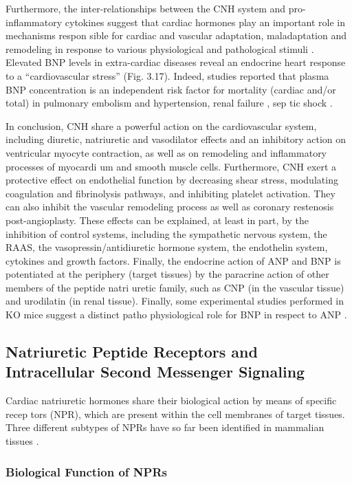 \documentclass[14pt,a4paper,onecolumn]{extarticle}
\begin{document}
Furthermore, the inter-relationships between the CNH system and pro-inflammatory cytokines suggest that cardiac hormones play an important role in mechanisms respon sible for cardiac and vascular adaptation, maladaptation and remodeling in response to various physiological and pathological stimuli \citep{32} \citep{35}.  Elevated BNP levels in extra-cardiac diseases reveal an endocrine heart response to a “cardiovascular stress” (Fig. 3.17). Indeed,  studies reported that plasma BNP concentration is an independent risk factor for mortality (cardiac and/or total) in pulmonary embolism \citep{121} \citep{123} \citep{124} and hypertension, renal failure \citep{28} \citep{100} \citep{144}, sep tic shock \citep{145}.

In conclusion, CNH share a powerful action on the cardiovascular system, including diuretic, natriuretic and vasodilator effects and an inhibitory action on ventricular myocyte contraction, as well as on remodeling and inflammatory processes of myocardi um and smooth muscle cells. Furthermore, CNH exert a protective effect on endothelial function by decreasing shear stress, modulating coagulation and fibrinolysis pathways, and inhibiting platelet activation. They can also inhibit the vascular remodeling process as well as coronary restenosis post-angioplasty. These effects can be explained, at least in part, by the inhibition of control systems, including the sympathetic nervous system, the RAAS, the vasopressin/antidiuretic hormone system, the endothelin system, cytokines and growth factors. Finally, the endocrine action of ANP and BNP is potentiated at the periphery (target tissues) by the paracrine action of other members of the peptide natri uretic family, such as CNP (in the vascular tissue) and urodilatin (in renal tissue).  Finally, some experimental studies performed in KO mice suggest a distinct patho physiological role for BNP in respect to ANP \citep{18}.

\subsection{Natriuretic Peptide Receptors and Intracellular Second Messenger Signaling}
Cardiac natriuretic hormones share their biological action by means of specific recep tors (NPR), which are present within the cell membranes of target tissues. Three different subtypes of NPRs have so far been identified in mammalian tissues \citep{112} \citep{165}.

\subsubsection{Biological Function of NPRs}
\end{document}
